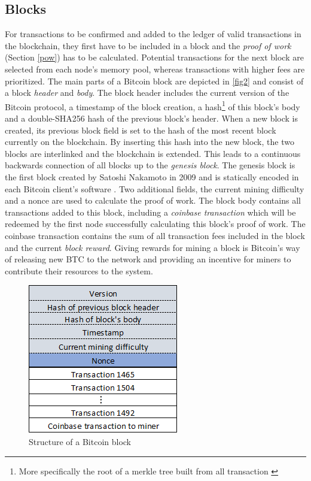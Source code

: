 \documentclass[a4paper,12pt,twoside]{report}
\begin{document}
\subsection{Blocks}
For transactions to be confirmed and added to the ledger of valid transactions in the blockchain, they first have to be included in a block and the \textit{proof of work} (Section \ref{pow}) has to be calculated. Potential transactions for the next block are selected from each node's memory pool, whereas transactions with higher fees are prioritized. The main parts of a Bitcoin block are depicted in \autoref{fig2} and consist of a block \textit{header} and \textit{body}. The block header includes the current version of the Bitcoin protocol, a timestamp of the block creation, a hash\footnote{More specifically the root of a merkle tree built from all transaction \cite{okupski2014bitcoin}} of this block's body and a double-SHA256 hash of the previous block's header. When a new block is created, its previous block field is set to the hash of the most recent block currently on the blockchain. By inserting this hash into the new block, the two blocks are interlinked and the blockchain is extended. This leads to a continuous backwards connection of all blocks up to the \textit{genesis block}. The genesis block is the first block created by Satoshi Nakamoto in 2009 and is statically encoded in each Bitcoin client's software \cite{antonopoulos2017mastering}. Two additional fields, the current mining difficulty and a nonce are used to calculate the proof of work. The block body contains all transactions added to this block, including a \textit{coinbase transaction} which will be redeemed by the first node successfully calculating this block's proof of work. The coinbase transaction contains the sum of all transaction fees included in the block and the current \textit{block reward}. Giving rewards for mining a block is Bitcoin's way of releasing new BTC to the network and providing an incentive for miners to contribute their resources to the system. \cite{okupski2014bitcoin,antonopoulos2017mastering}
\begin{figure}[ht]
	\centering
  \includegraphics[scale=0.7]{BlockExample.png}
	\caption{Structure of a Bitcoin block \cite{DSAwithTime,okupski2014bitcoin}}
	\label{fig2}
\end{figure}
\end{document}
